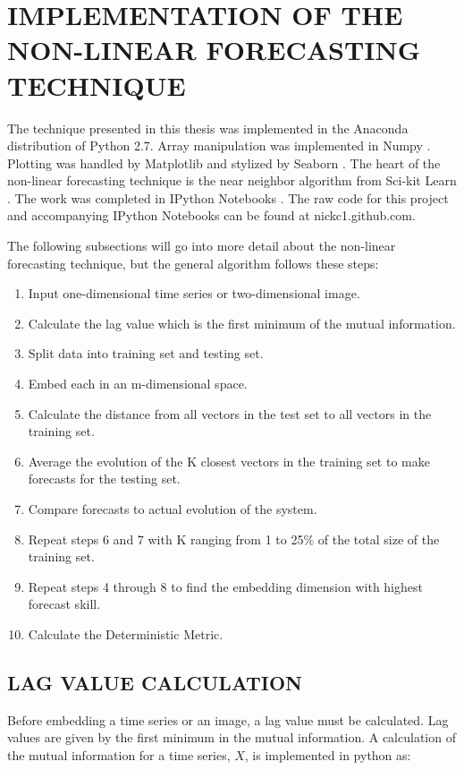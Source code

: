 
\section{IMPLEMENTATION OF THE NON-LINEAR FORECASTING TECHNIQUE}

The technique presented in this thesis was implemented in the Anaconda distribution of Python 2.7. Array manipulation was implemented in Numpy \cite{numpy}. Plotting was handled by Matplotlib \cite{matplotlib} and stylized by Seaborn \cite{seaborn}. The heart of the non-linear forecasting technique is the near neighbor algorithm from Sci-kit Learn \cite{scikit}. The work was completed in IPython Notebooks \cite{ipython}. The raw code for this project and accompanying IPython Notebooks can be found at nickc1.github.com.

The following subsections will go into more detail about the non-linear forecasting technique, but the general algorithm follows these steps:

\begin{enumerate}
\item Input one-dimensional time series or two-dimensional image.
\item Calculate the lag value which is the first minimum of the mutual information.
\item Split data into training set and testing set.
\item Embed each in an m-dimensional space.
\item Calculate the distance from all vectors in the test set to all vectors in the training set.
\item Average the evolution of the K closest vectors in the training set to make forecasts for the testing set.
\item Compare forecasts to actual evolution of the system.
\item Repeat steps 6 and 7 with K ranging from 1 to 25\% of the total size of the training set.
\item Repeat steps 4 through 8 to find the embedding dimension with highest forecast skill.
\item Calculate the Deterministic Metric.
\end{enumerate}

\subsection{LAG VALUE CALCULATION}
Before embedding a time series or an image, a lag value must be calculated. Lag values are given by the first minimum in the mutual information. A calculation of the mutual information for a time series, $X$, is implemented in python as:

